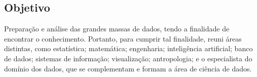 \subsection*{Objetivo}
Preparação e análise das grandes massas de dados, tendo a finalidade de encontrar o conhecimento.
Portanto, para cumprir tal finalidade, reuni áreas distintas, como estatística; matemática; engenharia; inteligência artificial; banco de dados; sistemas de informação; visualização; antropologia; e o especialista do domínio dos dados, que se complementam e formam a área de ciência de dados.
